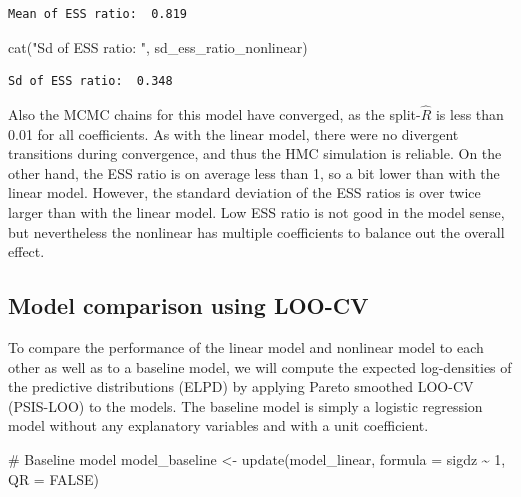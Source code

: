 \documentclass[
  letterpaper,
  DIV=11,
  numbers=noendperiod]{scrartcl}
\newenvironment{Shaded}{\begin{snugshade}}{\end{snugshade}}
\newcommand{\AttributeTok}[1]{\textcolor[rgb]{0.40,0.45,0.13}{#1}}
\newcommand{\CommentTok}[1]{\textcolor[rgb]{0.37,0.37,0.37}{#1}}
\newcommand{\ConstantTok}[1]{\textcolor[rgb]{0.56,0.35,0.01}{#1}}
\newcommand{\DecValTok}[1]{\textcolor[rgb]{0.68,0.00,0.00}{#1}}
\newcommand{\FunctionTok}[1]{\textcolor[rgb]{0.28,0.35,0.67}{#1}}
\newcommand{\NormalTok}[1]{\textcolor[rgb]{0.00,0.23,0.31}{#1}}
\newcommand{\OtherTok}[1]{\textcolor[rgb]{0.00,0.23,0.31}{#1}}
\newcommand{\SpecialCharTok}[1]{\textcolor[rgb]{0.37,0.37,0.37}{#1}}
\newcommand{\StringTok}[1]{\textcolor[rgb]{0.13,0.47,0.30}{#1}}
\begin{document}
\begin{verbatim}
Mean of ESS ratio:  0.819
\end{verbatim}

\begin{Shaded}
\begin{Highlighting}[]
\FunctionTok{cat}\NormalTok{(}\StringTok{"Sd of ESS ratio: "}\NormalTok{, sd\_ess\_ratio\_nonlinear)}
\end{Highlighting}
\end{Shaded}

\begin{verbatim}
Sd of ESS ratio:  0.348
\end{verbatim}

Also the MCMC chains for this model have converged, as the
split-\(\hat{R}\) is less than 0.01 for all coefficients. As with the
linear model, there were no divergent transitions during convergence,
and thus the HMC simulation is reliable. On the other hand, the ESS
ratio is on average less than 1, so a bit lower than with the linear
model. However, the standard deviation of the ESS ratios is over twice
larger than with the linear model. Low ESS ratio is not good in the
model sense, but nevertheless the nonlinear has multiple coefficients to
balance out the overall effect.

\hypertarget{model-comparison-using-loo-cv}{%
\subsection{Model comparison using
LOO-CV}\label{model-comparison-using-loo-cv}}

To compare the performance of the linear model and nonlinear model to
each other as well as to a baseline model, we will compute the expected
log-densities of the predictive distributions (ELPD) by applying Pareto
smoothed LOO-CV (PSIS-LOO) to the models. The baseline model is simply a
logistic regression model without any explanatory variables and with a
unit coefficient.

\begin{Shaded}
\begin{Highlighting}[]
\CommentTok{\# Baseline model}
\NormalTok{model\_baseline }\OtherTok{\textless{}{-}} \FunctionTok{update}\NormalTok{(model\_linear, }\AttributeTok{formula =}\NormalTok{ sigdz }\SpecialCharTok{\textasciitilde{}} \DecValTok{1}\NormalTok{, }\AttributeTok{QR =} \ConstantTok{FALSE}\NormalTok{)}
\end{Highlighting}
\end{Shaded}
\end{document}
